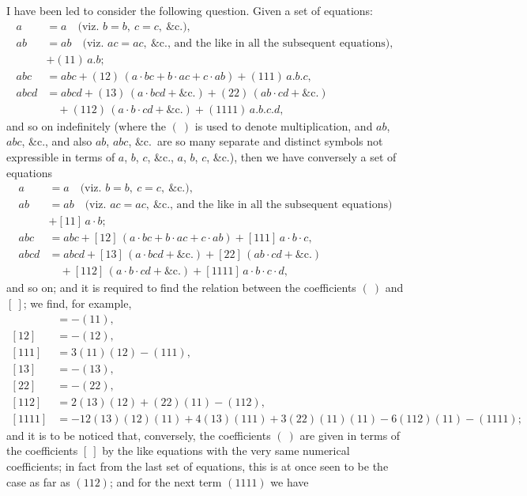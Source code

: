 \documentclass[11pt,a4paper]{article}
\theoremstyle{definition}
\begin{document}
I have been led to consider the following question. Given a set of equations:
\begin{align*}
a &= a \quad \text{(viz. } b = b,\ c = c,\ \&\text{c.)},\\
ab &= ab \quad \text{(viz. } ac = ac,\ \&\text{c., and the like in all the subsequent equations)},\\
&+ (11)\, a.b;\\
abc &= abc + (12)\,(a \cdot bc + b \cdot ac + c \cdot ab) + (111)\, a.b.c,\\
abcd &= abcd + (13)\,(a \cdot bcd + \&\text{c.}) + (22)\,(ab \cdot cd + \&\text{c.})\\
&\quad + (112)\,(a \cdot b \cdot cd + \&\text{c.}) + (1111)\, a.b.c.d,
\end{align*}
and so on indefinitely (where the $(\ )$ is used to denote multiplication, and $ab$, $abc$, \&c., and also $ab$, $abc$, \&c.\ are so many separate and distinct symbols not expressible in terms of $a$, $b$, $c$, \&c., $a$, $b$, $c$, \&c.), then we have conversely a set of equations
\begin{align*}
a &= a \quad \text{(viz. } b = b,\ c = c,\ \&\text{c.)},\\
ab &= ab \quad \text{(viz. } ac = ac,\ \&\text{c., and the like in all the subsequent equations)}\\
&+ [11]\, a \cdot b;\\
abc &= abc + [12]\,(a \cdot bc + b \cdot ac + c \cdot ab) + [111]\, a \cdot b \cdot c,\\
abcd &= abcd + [13]\,(a \cdot bcd + \&\text{c.}) + [22]\,(ab \cdot cd + \&\text{c.})\\
&\quad + [112]\,(a \cdot b \cdot cd + \&\text{c.}) + [1111]\, a \cdot b \cdot c \cdot d,
\end{align*}
and so on; and it is required to find the relation between the coefficients $(\ )$ and $[\ ]$; we find, for example,
\begin{align*}
[11] &= - (11),\\
[12] &= - (12),\\
[111] &= 3(11)(12) - (111),\\
[13] &= - (13),\\
[22] &= - (22),\\
[112] &= 2(13)(12) + (22)(11) - (112),\\
[1111] &= -12(13)(12)(11) + 4(13)(111) + 3(22)(11)(11) - 6(112)(11) - (1111);
\end{align*}
and it is to be noticed that, conversely, the coefficients $(\ )$ are given in terms of the coefficients $[\ ]$ by the like equations with the very same numerical coefficients; in fact from the last set of equations, this is at once seen to be the case as far as $(112)$; and for the next term $(1111)$ we have
\end{document}
